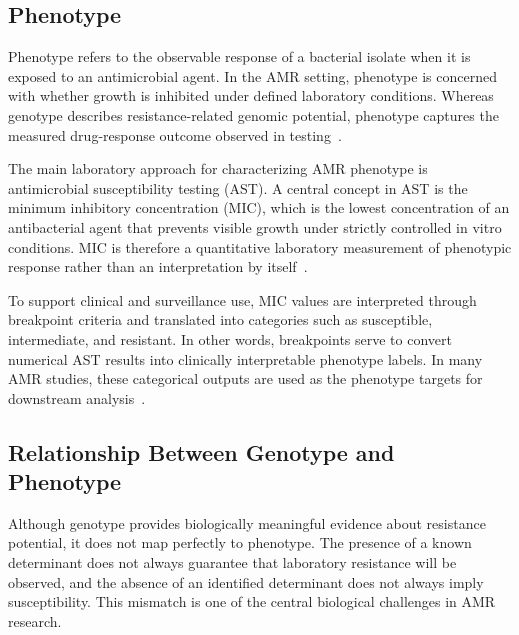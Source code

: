 \subsection{Phenotype}

Phenotype refers to the observable response of a bacterial isolate when it is exposed to an antimicrobial agent. In the AMR setting, phenotype is concerned with whether growth is inhibited under defined laboratory conditions. Whereas genotype describes resistance-related genomic potential, phenotype captures the measured drug-response outcome observed in testing~\citep{shen2024comparison}.

The main laboratory approach for characterizing AMR phenotype is antimicrobial susceptibility testing (AST). A central concept in AST is the minimum inhibitory concentration (MIC), which is the lowest concentration of an antibacterial agent that prevents visible growth under strictly controlled in vitro conditions. MIC is therefore a quantitative laboratory measurement of phenotypic response rather than an interpretation by itself~\citep{kowalskakrochmal2021mic,doern2011ast}.

To support clinical and surveillance use, MIC values are interpreted through breakpoint criteria and translated into categories such as susceptible, intermediate, and resistant. In other words, breakpoints serve to convert numerical AST results into clinically interpretable phenotype labels. In many AMR studies, these categorical outputs are used as the phenotype targets for downstream analysis~\citep{doern2011ast,jenkins2011breakpoints,shen2024comparison}.

\subsection{Relationship Between Genotype and Phenotype}

Although genotype provides biologically meaningful evidence about resistance potential, it does not map perfectly to phenotype. The presence of a known determinant does not always guarantee that laboratory resistance will be observed, and the absence of an identified determinant does not always imply susceptibility. This mismatch is one of the central biological challenges in AMR research.

